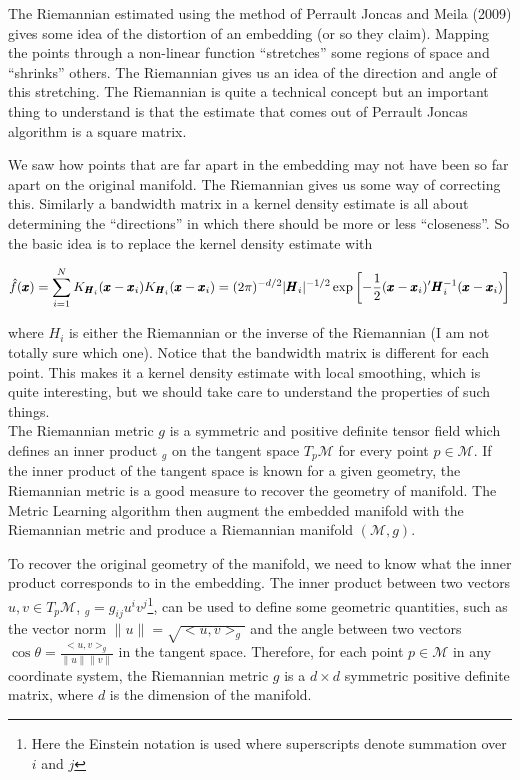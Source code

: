 \documentclass[11pt,a4paper,]{article}
\begin{document}
The Riemannian estimated using the method of Perrault Joncas and Meila (2009) gives some idea of the distortion of an embedding (or so they claim). Mapping the points through a non-linear function ``stretches'' some regions of space and ``shrinks'' others. The Riemannian gives us an idea of the direction and angle of this stretching. The Riemannian is quite a technical concept but an important thing to understand is that the estimate that comes out of Perrault Joncas algorithm is a square matrix.

We saw how points that are far apart in the embedding may not have been so far apart on the original manifold. The Riemannian gives us some way of correcting this. Similarly a bandwidth matrix in a kernel density estimate is all about determining the ``directions'' in which there should be more or less ``closeness''. So the basic idea is to replace the kernel density estimate with

\[
\hat{f}(\pmb{x})=\sum\limits_{i=1}^N K_{\pmb{H}_i}(\pmb{x}-\pmb{x}_i)\\
K_{\pmb{H}_i}(\pmb{x}-\pmb{x}_i)=(2\pi)^{-d/2}|\pmb{H}_i|^{-1/2}\exp\left[-\frac{1}{2}(\pmb{x}-\pmb{x}_i)'\pmb{H}_i^{-1}(\pmb{x}-\pmb{x}_i)\right]
\]

where \(H_i\) is either the Riemannian or the inverse of the Riemannian (I am not totally sure which one). Notice that the bandwidth matrix is different for each point. This makes it a kernel density estimate with local smoothing, which is quite interesting, but we should take care to understand the properties of such things.\\

The Riemannian metric \(g\) is a symmetric and positive definite tensor field which defines an inner product \(<,>_g\) on the tangent space \(T_p\mathcal{M}\) for every point \(p \in \mathcal{M}\).
If the inner product of the tangent space is known for a given geometry, the Riemannian metric is a good measure to recover the geometry of manifold.
The Metric Learning algorithm \autocite{Perrault-Joncas2013-pq} then augment the embedded manifold with the Riemannian metric and produce a Riemannian manifold \((\mathcal{M}, g)\).

To recover the original geometry of the manifold, we need to know what the inner product corresponds to in the embedding.
The inner product between two vectors \(u,v \in T_p\mathcal{M}\), \(<u,v>_g=g_{ij}u^iv^j\)\footnote{Here the Einstein notation is used where superscripts denote summation over \(i\) and \(j\)}, can be used to define some geometric quantities, such as the vector norm \(\|u\|=\sqrt{<u,v>_g}\) and the angle between two vectors \(\cos{\theta}=\frac{<u,v>_g}{\|u\|\|v\|}\) in the tangent space. Therefore, for each point \(p\in \mathcal{M}\) in any coordinate system, the Riemannian metric \(g\) is a \(d\times d\) symmetric positive definite matrix, where \(d\) is the dimension of the manifold.
\end{document}
